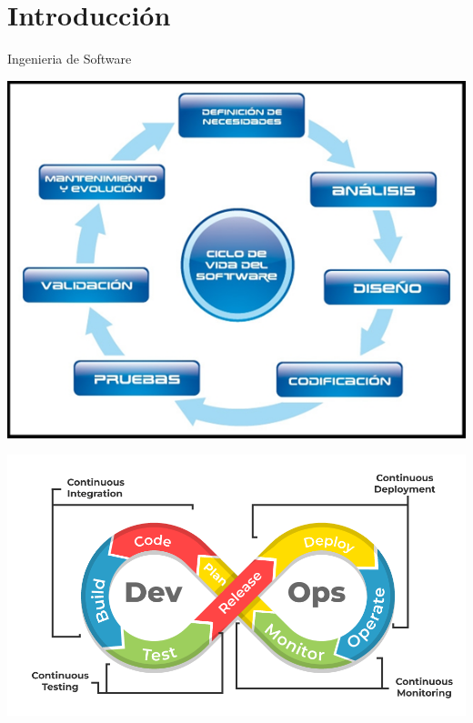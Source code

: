 \documentclass[
  24pt, %
  aspectratio=169, %
]{beamer}
\begin{document}
\section{Introducción}
\begin{frame}{Ingenieria de Software}

  \begin{center}
    \begin{minipage}{0.38\linewidth}
      \includegraphics[width=\linewidth]{ciclo_vida_software.png}
    \end{minipage}%
    \hfill
    \begin{minipage}{0.49\linewidth}
      \includegraphics[width=\linewidth]{DevOps.png}
    \end{minipage}
  \end{center}
\end{frame}  
\end{document}
